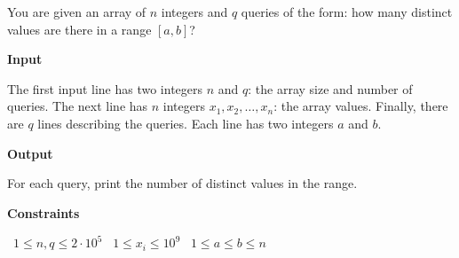 You are given an array of $n$ integers and $q$ queries of the form: how many distinct values are there in a range $[a,b]$?

\vspace{0.3cm}\noindent\textbf{Input}

The first input line has two integers $n$ and $q$: the array size and number of queries.
The next line has $n$ integers $x_1,x_2,\dots,x_n$: the array values.
Finally, there are $q$ lines describing the queries. Each line has two integers $a$ and $b$.

\vspace{0.3cm}\noindent\textbf{Output}

For each query, print the number of distinct values in the range.

\vspace{0.3cm}\noindent\textbf{Constraints}

\textbullet\ $1 \le n,q \le 2 \cdot 10^5$
\textbullet\ $1 \le x_i \le 10^9$
\textbullet\ $1 \le a \le b \le n$